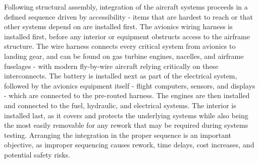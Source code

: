 Following structural assembly, integration of the aircraft systems proceeds in a defined sequence driven by accessibility - items that are hardest to reach or that other systems depend on are installed first. The avionics wiring harness is installed first, before any interior or equipment obstructs access to the airframe structure. The wire harness connects every critical system from avionics to landing gear, and can be found on gas turbine engines, nacelles, and airframe fuselages - with modern fly-by-wire aircraft relying critically on these interconnects. The battery is installed next as part of the electrical system, followed by the avionics equipment itself - flight computers, sensors, and displays - which are connected to the pre-routed harness. The engines are then installed and connected to the fuel, hydraulic, and electrical systems. The interior is installed last, as it covers and protects the underlying systems while also being the most easily removable for any rework that may be required during systems testing. Arranging the integration in the proper sequence is an important objective, as improper sequencing causes rework, time delays, cost increases, and potential safety risks.  



